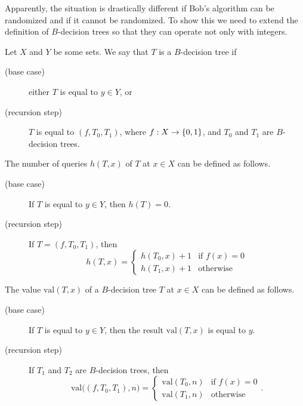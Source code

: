 Apparently, the situation is drastically different if Bob's algorithm can be
randomized and if it cannot be randomized.
To show this we need to extend the definition of $B$-decision trees so that they
can operate not only with integers.
\begin{definition}
  Let $X$ and $Y$ be some sets. We say that $T$ is a $B$-decision tree if
  \begin{description}
    \item [(base case)] either $T$ is equal to $y \in Y$, or
    \item [(recursion step)] $T$ is equal to $(f, T_0, T_1)$,
      where $f : X \to \set{0, 1}$, and $T_0$ and $T_1$
      are $B$-decision trees.
  \end{description}

  The number of queries $h(T, x)$ of $T$ at $x \in X$ can be defined as follows.
  \begin{description}
    \item [(base case)] If $T$ is equal to $y \in Y$, then $h(T) = 0$.
    \item[(recursion step)] If $T = (f, T_0, T_1)$, then
      \[
          h(T, x) = 
          \begin{cases}
            h(T_0, x) + 1 & \text{if } f(x) = 0 \\
            h(T_1, x) + 1 & \text{otherwise}
          \end{cases}
      \]
  \end{description}

  The value $\mathrm{val}(T, x)$ of a $B$-decision tree $T$ at $x \in X$
  can be defined as follows.
  \begin{description}
      \item [(base case)] If $T$ is equal to $y \in Y$,
        then the result $\mathrm{val}(T, x)$ is equal to $y$.
      \item[(recursion step)] If $T_1$ and $T_2$ are $B$-decision trees, then
        \[
          \mathrm{val}\Big((f, T_0, T_1), n\Big) =
          \begin{cases}
            \mathrm{val}(T_0, n) & \text{if } f(x) = 0 \\
            \mathrm{val}(T_1, n) & \text{otherwise}
          \end{cases}.
        \]
  \end{description}
\end{definition}

